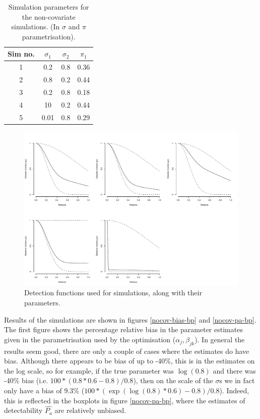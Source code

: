 \begin{table}[ht]
\centering
\begin{tabular}{c c c c}
Sim no. & $\sigma_1$ & $\sigma_2$ & $\pi_1$\\
\hline
\hline
1 & 0.2  &  0.8  &  0.36 \\
2 & 0.8  &  0.2  &  0.44 \\
3 & 0.2  &  0.8  &  0.18 \\
4 & 10  &  0.2  &  0.44\\
5 & 0.01  &  0.8  &  0.29 \\
\end{tabular}
\label{nocov-simtable}
\caption{Simulation parameters for the non-covariate simulations. (In $\sigma$ and $\pi$ parametrisation).}
\end{table}


\begin{figure}
\centering
\includegraphics[width=6in]{mix/figs/nocovsims.pdf}
\caption{Detection functions used for simulations, along with their parameters.}
\label{nocov-sims}
\end{figure}

Results of the simulations are shown in figures \ref{nocov-bias-bp} and \ref{nocov-pa-bp}. The first figure shows the percentage relative bias in the parameter estimates given in the parametrisation used by the optimisation ($\alpha_j,\beta_{jk}$). In general the results seem good, there are only a couple of cases where the estimates do have bias. Although there appears to be bias of up to -40\%, this is in the estimates on the log scale, so for example, if the true parameter was $\log(0.8)$ and there was -40\% bias (i.e. $100*(0.8*0.6-0.8)/0.8$), then on the scale of the $\sigma$s we in fact only have a bias of 9.3\% ($ 100*(\exp(\log(0.8)*0.6)-0.8)/0.8$). Indeed, this is reflected in the boxplots in figure \ref{nocov-pa-bp}, where the estimates of detectability $\hat{P_a}$ are relatively unbiased.





